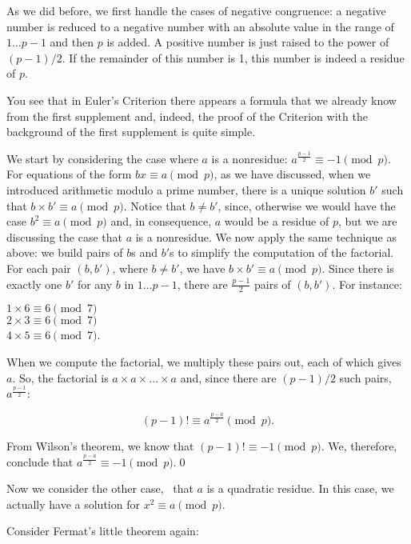 \documentclass{scrreprt}
\newcommand{\Varid}[1]{\mathit{#1}}
\begin{document}
As we did before, we first handle the cases of negative congruence:
a negative number is reduced to a negative number with an absolute
value in the range of $1\dots p-1$ and then $p$ is added.
A positive number is just raised to the power of $(p-1) / 2$.
If the remainder of this number is 1, 
this number is indeed a residue of $p$.

You see that in Euler's Criterion there appears
a formula that we already know from the first supplement
and, indeed, the proof of the Criterion 
with the background of the first supplement is quite simple.

We start by considering the case where $a$ is a nonresidue:
$a^{\frac{p-1}{2}} \equiv -1 \pmod{p}$.
For equations of the form $bx \equiv a \pmod{p}$,
as we have discussed, when we introduced 
arithmetic modulo a prime number,
there is a unique solution $b'$ 
such that $b \times b' \equiv a \pmod{p}$.
Notice that $b \neq b'$, since, otherwise
we would have the case $b^2 \equiv a \pmod{p}$ and,
in consequence, $a$ would be a residue of $p$,
but we are discussing the case that $a$ is
a nonresidue.
We now apply the same technique as above:
we build pairs of $b$s and $b'$s
to simplify the computation of the factorial.
For each pair \ensuremath{(\Varid{b},\Varid{b'})}, where $b \neq b'$, we have
$b \times b' \equiv a \pmod{p}$.
Since there is exactly one $b'$ for any $b$ in $1\dots p-1$,
there are $\frac{p-1}{2}$ pairs of $(b,b')$.
For instance:

$1 \times 6 \equiv 6 \pmod{7}$\\
$2 \times 3 \equiv 6 \pmod{7}$\\
$4 \times 5 \equiv 6 \pmod{7}$.

When we compute the factorial,
we multiply these pairs out, each of which gives $a$.
So, 
the factorial is $a \times a \times \dots \times a$ and,
since there are $(p-1)/2$ such pairs,
$a^{\frac{p-1}{2}}$:

\begin{equation}
  (p-1)! \equiv a^{\frac{p-a}{2}} \pmod{p}.
\end{equation}

From Wilson's theorem, we know
that $(p-1)! \equiv -1 \pmod{p}$.
We, therefore, conclude that 
$a^{\frac{p-a}{2}} \equiv -1 \pmod{p}$.\qed

Now we consider the other case, \ie\
that $a$ is a quadratic residue.
In this case, we actually have a solution
for $x^2 \equiv a \pmod{p}$.

Consider Fermat's little theorem again:
\end{document}
